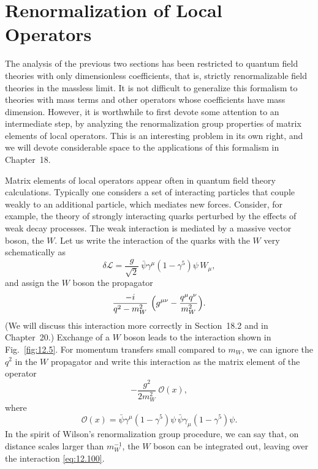 \section{Renormalization of Local Operators}

The analysis of the previous two sections has been restricted to quantum
field theories with only dimensionless coefficients, that is, strictly
renormalizable field theories in the massless limit.  It is not difficult to
generalize this formalism to theories with mass terms and other operators
whose coefficients have mass dimension.  However, it is worthwhile to first
devote some attention to an intermediate step, by analyzing the renormalization
group properties of matrix elements of local operators.  This is an
interesting problem in its own right, and we will devote considerable space
to the applications of this formalism in Chapter~18.

Matrix elements of local operators appear often in quantum field theory
calculations.  Typically one considers a set of interacting particles that
couple weakly to an additional particle, which mediates new forces.
Consider, for example, the theory of strongly interacting quarks perturbed by
the effects of weak decay processes.  The weak interaction is mediated by a
massive vector boson, the $W$.  Let us write the interaction of the quarks
with the $W$ very schematically as
\begin{equation}
  \delta\mathcal{L} = \frac{g}{\sqrt{2}}\ \bar{\psi}\gamma^\mu(1-\gamma^5)\psi\,
    W_\mu ,
  \label{eq:12.98}
\end{equation}
and assign the $W$ boson the propagator
\begin{equation}
  \frac{-i}{q^2-m_W^2}\ \Bigl( g^{\mu\nu} - \frac{q^\mu q^\nu}{m_W^2}
    \Bigr) .
\end{equation}
(We will discuss this interaction more correctly in Section~18.2 and in
Chapter~20.)  Exchange of a $W$ boson leads to the interaction shown in
Fig.~\ref{fig:12.5}.  For momentum transfers small compared to $m_W$, we can
ignore the $q^2$ in the $W$ propagator and write this interaction as the
matrix element of the operator
\begin{equation}
  -\frac{g^2}{2m_W^2}\ \mathcal{O}(x) ,
  \label{eq:12.100}
\end{equation}
where
\begin{equation}
  \mathcal{O}(x) = \bar{\psi}\gamma^\mu(1-\gamma^5)\psi\,
    \bar{\psi}\gamma_\mu(1-\gamma^5)\psi .
\end{equation}
In the spirit of Wilson's renormalization group procedure, we can say that,
on distance scales larger than $m_W^{-1}$, the $W$ boson can be integrated
out, leaving over the interaction \eqref{eq:12.100}.


